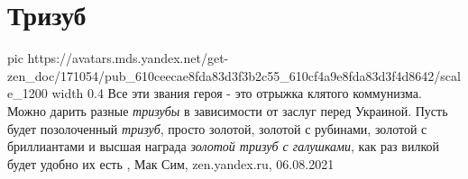  
 
 
 
 
\chapter{Тризуб}

\ifcmt
  pic https://avatars.mds.yandex.net/get-zen_doc/171054/pub_610ceecae8fda83d3f3b2c55_610cf4a9e8fda83d3f4d8642/scale_1200
  width 0.4
\fi
Все эти звания героя - это отрыжка клятого коммунизма. Можно дарить разные
\emph{тризубы} в зависимости от заслуг перед Украиной. Пусть будет позолоченный
\emph{тризуб}, просто золотой, золотой с рубинами, золотой с бриллиантами и высшая
награда \emph{золотой тризуб с галушками}, как раз вилкой будет удобно их есть
, 
Мак Сим, zen.yandex.ru, 06.08.2021
